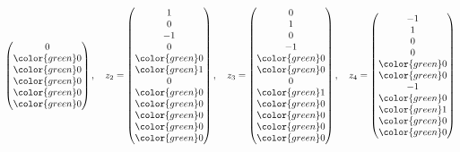 \begin{loesung}
\[\begin{pmatrix}
              0\\
\color{green} 0\\
\color{green} 0\\
\color{green} 0\\
\color{green} 0\\
\color{green} 0
\end{pmatrix}
,\quad
z_2=\begin{pmatrix}
              1\\
              0\\
             -1\\
              0\\
\color{green} 0\\
\color{green} 1\\
              0\\
\color{green} 0\\
\color{green} 0\\
\color{green} 0\\
\color{green} 0\\
\color{green} 0
\end{pmatrix}
,\quad
z_3=\begin{pmatrix}
              0\\
              1\\
              0\\
             -1\\
\color{green} 0\\
\color{green} 0\\
              0\\
\color{green} 1\\
\color{green} 0\\
\color{green} 0\\
\color{green} 0\\
\color{green} 0
\end{pmatrix}
,\quad
z_4=\begin{pmatrix}
             -1\\
              1\\
              0\\
              0\\
\color{green} 0\\
\color{green} 0\\
             -1\\
\color{green} 0\\
\color{green} 1\\
\color{green} 0\\
\color{green} 0\\

\end{pmatrix}\]
\end{loesung}

